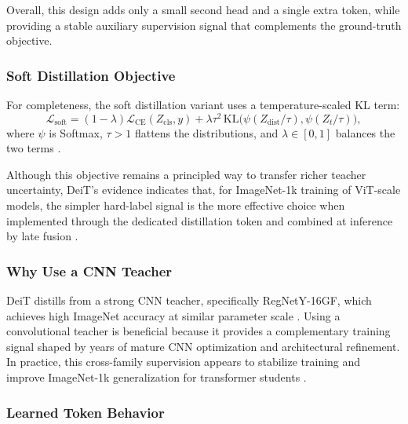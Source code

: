 \noindent
Overall, this design adds only a small second head and a single extra token, while providing a stable auxiliary supervision signal that complements the ground-truth objective.

\subsubsection{Soft Distillation Objective}
\label{subsubsec:chapter18_deit_soft}

\noindent
For completeness, the soft distillation variant uses a temperature-scaled KL term:
\begin{equation}
	\mathcal{L}_{\text{soft}} =
	(1 - \lambda)\mathcal{L}_{\text{CE}}(Z_{\text{cls}}, y)
	+ \lambda \tau^2 \,
	\text{KL}\big(\psi(Z_{\text{dist}}/\tau), \psi(Z_t/\tau)\big),
	\label{eq:chapter18_deit_soft_distillation}
\end{equation}
where \(\psi\) is Softmax, \(\tau > 1\) flattens the distributions, and \(\lambda \in [0,1]\) balances the two terms \cite{touvron2021_deit}.

\noindent
Although this objective remains a principled way to transfer richer teacher uncertainty, DeiT's evidence indicates that, for ImageNet-1k training of ViT-scale models, the simpler hard-label signal is the more effective choice when implemented through the dedicated distillation token and combined at inference by late fusion \cite{touvron2021_deit}.

\subsubsection{Why Use a CNN Teacher}
\label{subsubsec:chapter18_deit_teacher_choice}

\noindent
DeiT distills from a strong CNN teacher, specifically RegNetY-16GF, which achieves high ImageNet accuracy at similar parameter scale \cite{touvron2021_deit}. Using a convolutional teacher is beneficial because it provides a complementary training signal shaped by years of mature CNN optimization and architectural refinement. In practice, this cross-family supervision appears to stabilize training and improve ImageNet-1k generalization for transformer students \cite{touvron2021_deit}.

\subsubsection{Learned Token Behavior}
\label{subsubsec:chapter18_deit_token_behavior}

